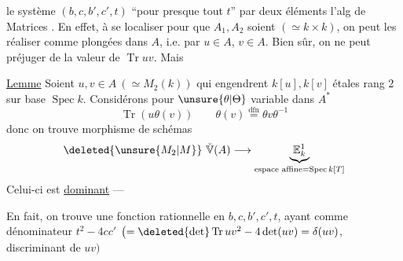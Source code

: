 le système $(b,c,b',c',t)$ ``pour presque tout  $t$''  par deux éléments   l'alg de Matrices . En effet,   à se localiser pour que $A_1,A_2$ soient  $(\simeq k\times k)$, on peut les réaliser comme plongées dans $A$, i.e. par $u\in A$, $v\in A$.
Bien sûr, on ne  peut préjuger de la valeur de $\operatorname{Tr}uv$. Mais 

\uline{Lemme} Soient $u,v\in A\ (\simeq M_2(k))$ qui  engendrent $k[u],k[v]$ étales rang 2 sur base $\operatorname{Spec}k$. Considérons pour $\unsure{\theta|\Theta}$ variable dans $A^*$
\[ \operatorname{Tr}(u\theta(v)) \qquad \theta(v)\overset{\text{dfn}}{=}\theta v\theta^{-1} \]
donc on trouve morphisme de schémas
\[ \deleted{\unsure{M_2|M}}\ \check{\mathbb V}(A)\longrightarrow\underbrace{\mathbb E^1_k}_{\text{espace affine}=\operatorname{Spec}k[T]} \]
Celui-ci est \uline{dominant} --- 

En fait, on trouve une fonction rationnelle en $b,c,b',c',t$, ayant comme dénominateur $t^2-4cc'$ $\bigl(=\deleted{\det}\operatorname{Tr}uv^2-4\det(uv)=\delta(uv)$, discriminant de $uv\bigr)$
